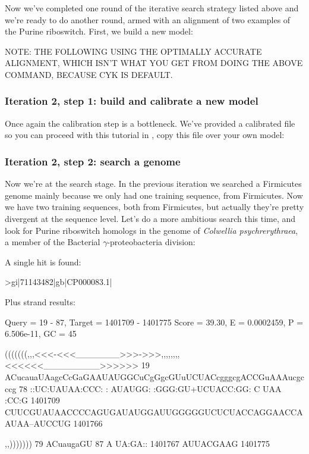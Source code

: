 
Now we've completed one round of the iterative search strategy listed
above and we're ready to do another round, armed with an alignment of
two examples of the Purine riboswitch. First, we build a new model:

NOTE: THE FOLLOWING USING THE OPTIMALLY ACCURATE ALIGNMENT, WHICH
ISN'T WHAT YOU GET FROM DOING THE ABOVE COMMAND, BECAUSE CYK IS DEFAULT.

\subsubsection{Iteration 2, step 1: build and calibrate a new model}

Once again the calibration step is a bottleneck. We've provided a
calibrated file so you can proceed with this tutorial in
, copy this file over your own model:


\subsubsection{Iteration 2, step 2: search a genome}

Now we're at the search stage. In the previous iteration we searched a
Firmicutes genome mainly because we only had one training sequence, from
Firmicutes. Now we have two training sequences, both from Firmicutes,
but actually they're pretty divergent at the sequence level. Let's do a
more ambitious search this time, and look for Purine riboswitch
homologs in the genome of \emph{Colwellia psychrerythraea}, a member of the
Bacterial $\gamma$-proteobacteria division:


A single hit is found:

\begin{sreoutput}
>gi|71143482|gb|CP000083.1|

  Plus strand results:

 Query = 19 - 87, Target = 1401709 - 1401775
 Score = 39.30, E = 0.0002459, P = 6.506e-11, GC =  45

           (((((((,,,<<<-<<<_______>>>->>>,,,,,,,,<<<<<<_________>>>>>>
        19 ACucauaUAagcCcGaGAAUAUGGCuCgGgcGUuUCUACcgggcgACCGuAAAucgcccg 78      
           ::UC:UAUAA:CCC: : AUAUGG: :GGG:GU+UCUACC:GG:  C  UAA   :CC:G
   1401709 CUUCGUAUAACCCCAGUGAUAUGGAUUGGGGGUCUCUACCAGGAACCAAUAA--AUCCUG 1401766 

           ,,)))))))
        79 ACuaugaGU 87      
           A UA:GA::
   1401767 AUUACGAAG 1401775 
\end{sreoutput}

